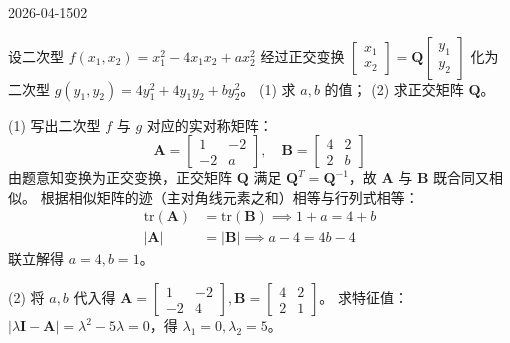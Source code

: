 \begin{mistake}{2026-04-15}{02}

\begin{problemcontent}
设二次型 \(f(x_1, x_2) = x_1^2 - 4x_1x_2 + ax_2^2\) 经过正交变换 \(\begin{bmatrix} x_1 \\ x_2 \end{bmatrix} = \boldsymbol{Q} \begin{bmatrix} y_1 \\ y_2 \end{bmatrix}\) 化为二次型 \(g(y_1, y_2) = 4y_1^2 + 4y_1y_2 + by_2^2\)。
(1) 求 \(a, b\) 的值；
(2) 求正交矩阵 \(\boldsymbol{Q}\)。
\end{problemcontent}

\begin{solutioncontent}
(1) 写出二次型 \(f\) 与 \(g\) 对应的实对称矩阵：
\[ \boldsymbol{A} = \begin{bmatrix} 1 & -2 \\ -2 & a \end{bmatrix}, \quad \boldsymbol{B} = \begin{bmatrix} 4 & 2 \\ 2 & b \end{bmatrix} \]
由题意知变换为正交变换，正交矩阵 \(\boldsymbol{Q}\) 满足 \(\boldsymbol{Q}^T=\boldsymbol{Q}^{-1}\)，故 \(\boldsymbol{A}\) 与 \(\boldsymbol{B}\) 既合同又相似。
根据相似矩阵的迹（主对角线元素之和）相等与行列式相等：
\[
\begin{aligned}
\text{tr}(\boldsymbol{A}) &= \text{tr}(\boldsymbol{B}) \implies 1 + a = 4 + b \\
|\boldsymbol{A}| &= |\boldsymbol{B}| \implies a - 4 = 4b - 4
\end{aligned}
\]
联立解得 \(a = 4, b = 1\)。

(2) 将 \(a, b\) 代入得 \(\boldsymbol{A} = \begin{bmatrix} 1 & -2 \\ -2 & 4 \end{bmatrix}, \boldsymbol{B} = \begin{bmatrix} 4 & 2 \\ 2 & 1 \end{bmatrix}\)。
求特征值：\(|\lambda\boldsymbol{I} - \boldsymbol{A}| = \lambda^2 - 5\lambda = 0\)，得 \(\lambda_1 = 0, \lambda_2 = 5\)。


\end{solutioncontent}
\end{mistake}
